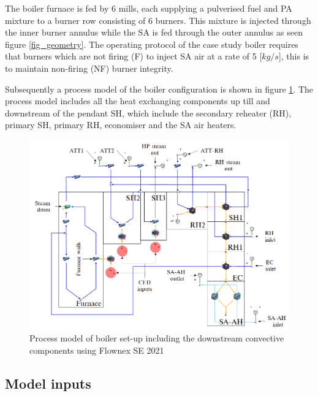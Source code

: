 \documentclass[review]{elsarticle}
\begin{document}
The boiler furnace is fed by 6 mills, each supplying a pulverised fuel and PA mixture to a burner row consisting of 6 burners. This mixture is injected through the inner burner annulus while the SA is fed through the outer annulus as seen figure \ref{fig_geometry}. The operating protocol of the case study boiler requires that burners which are not firing (F) to inject SA air at a rate of 5 [$kg/s$], this is to maintain non-firing (NF) burner integrity. 

Subsequently a process model of the boiler configuration is shown in figure \ref{fig_flownex}. The process model includes all the heat exchanging components up till and downstream of the pendant SH, which include the secondary reheater (RH), primary SH, primary RH, economiser and the SA air heaters.  
\begin{figure}[h!]
\centering
\includegraphics[scale=0.5]{FLOWNEX_SETUP}
\caption{Process model of boiler set-up including the downstream convective components using Flownex SE 2021}
\label{fig_flownex}
\end{figure}

\subsection{Model inputs}
\end{document}
